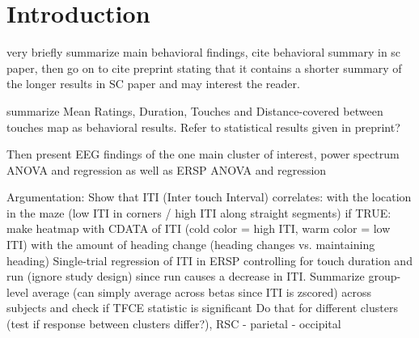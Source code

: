 \section{Introduction}

very briefly summarize main behavioral findings, cite behavioral summary in sc paper, then go on to cite preprint stating that it contains a shorter summary of the longer results in SC paper and may interest the reader.

summarize Mean Ratings, Duration, Touches and Distance-covered between touches map as behavioral results. Refer to statistical results given in preprint?

Then present EEG findings of the one main cluster of interest, power spectrum ANOVA and regression as well as ERSP ANOVA and regression

Argumentation:
Show that ITI (Inter touch Interval) correlates:
with the location in the maze (low ITI in corners / high ITI along straight segments)
if TRUE: make heatmap with CDATA of ITI (cold color = high ITI, warm color = low ITI)
with the amount of heading change (heading changes vs. maintaining heading)
Single-trial regression of ITI in ERSP controlling for touch duration and run (ignore study design) since run causes a decrease in ITI.
Summarize group-level average (can simply average across betas since ITI is zscored) across subjects and check if TFCE statistic is significant
Do that for different clusters (test if response between clusters differ?), RSC - parietal - occipital


